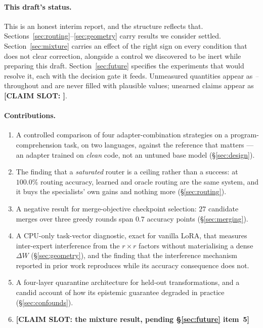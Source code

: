\documentclass[sigconf,review,anonymous]{acmart}
\newcommand{\pending}{\textcolor{gray}{\textit{--}}}
\newcommand{\slot}[1]{\textbf{[CLAIM SLOT: #1]}}
\begin{document}
\paragraph{This draft's status.} This is an honest interim report, and the structure reflects
that. Sections~\ref{sec:routing}--\ref{sec:geometry} carry results we consider settled.
Section~\ref{sec:mixture} carries an effect of the right sign on every condition that does not
clear correction, alongside a control we discovered to be inert while preparing this draft.
Section~\ref{sec:future} specifies the experiments that would resolve it, each with the
decision gate it feeds. Unmeasured quantities appear as \pending{} throughout and are never
filled with plausible values; unearned claims appear as \slot{}.

\paragraph{Contributions.}
\begin{enumerate}
\item A controlled comparison of four adapter-combination strategies on a program-comprehension
task, on two languages, against the reference that matters --- an adapter trained on
\emph{clean} code, not an untuned base model (\S\ref{sec:design}).
\item The finding that a \emph{saturated} router is a ceiling rather than a success: at
$100.0\%$ routing accuracy, learned and oracle routing are the same system, and it buys the
specialists' own gains and nothing more (\S\ref{sec:routing}).
\item A negative result for merge-objective checkpoint selection: $27$ candidate merges over
three greedy rounds span $0.7$ accuracy points (\S\ref{sec:merging}).
\item A CPU-only task-vector diagnostic, exact for vanilla LoRA, that measures inter-expert
interference from the $r\times r$ factors without materialising a dense $\Delta W$
(\S\ref{sec:geometry}), and the finding that the interference mechanism reported in prior work
reproduces while its accuracy consequence does not.
\item A four-layer quarantine architecture for held-out transformations, and a candid account
of how its epistemic guarantee degraded in practice (\S\ref{sec:confounds}).
\item \slot{the mixture result, pending \S\ref{sec:future} item~5}
\end{enumerate}
\end{document}
